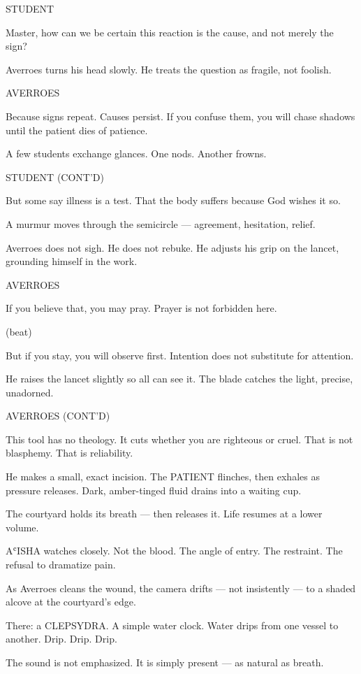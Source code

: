 \documentclass[12pt]{article}
\newlength{\charindent}
\newlength{\dialogueindent}
\newlength{\dialoguewidth}
\newlength{\parentheticalindent}
\newcommand{\action}[1]{%
  \noindent#1\par\vspace{0.75em}%
}
\newcommand{\character}[1]{%
  \needspace{3\baselineskip}%
  \par\vspace{0.5em}%
  \noindent\hspace*{\charindent}\MakeUppercase{#1}\nopagebreak[4]%
}
\newcommand{\parenthetical}[1]{%
  \par\nobreak\nopagebreak[4]%
  \noindent\hspace*{\parentheticalindent}(#1)%
}
\newcommand{\dialogue}[1]{%
  \par\nobreak\nopagebreak[4]%
  \noindent\hspace*{\dialogueindent}%
  \begin{minipage}[t]{\dialoguewidth}
  #1
  \end{minipage}%
  \par\vspace{0.5em}%
}
\newcommand{\contd}{\textsc{(cont'd)}}
\newcommand{\beat}{\parenthetical{beat}}
\begin{document}
\character{STUDENT}
\dialogue{Master, how can we be certain this reaction is the cause, and not merely the sign?}

\action{Averroes turns his head slowly. He treats the question as fragile, not foolish.}

\character{AVERROES}
\dialogue{Because signs repeat. Causes persist. If you confuse them, you will chase shadows until the patient dies of patience.}

\action{A few students exchange glances. One nods. Another frowns.}

\character{STUDENT \contd}
\dialogue{But some say illness is a test. That the body suffers because God wishes it so.}

\action{A murmur moves through the semicircle — agreement, hesitation, relief.}

\action{Averroes does not sigh. He does not rebuke. He adjusts his grip on the lancet, grounding himself in the work.}

\character{AVERROES}
\dialogue{If you believe that, you may pray. Prayer is not forbidden here.}

\beat

\dialogue{But if you stay, you will observe first. Intention does not substitute for attention.}

\action{He raises the lancet slightly so all can see it. The blade catches the light, precise, unadorned.}

\character{AVERROES \contd}
\dialogue{This tool has no theology. It cuts whether you are righteous or cruel. That is not blasphemy. That is reliability.}

\action{He makes a small, exact incision. The PATIENT flinches, then exhales as pressure releases. Dark, amber-tinged fluid drains into a waiting cup.}

\action{The courtyard holds its breath — then releases it. Life resumes at a lower volume.}

\action{AʿISHA watches closely. Not the blood. The angle of entry. The restraint. The refusal to dramatize pain.}

\action{As Averroes cleans the wound, the camera drifts — not insistently — to a shaded alcove at the courtyard’s edge.}

\action{There: a CLEPSYDRA. A simple water clock. Water drips from one vessel to another. Drip. Drip. Drip.}

\action{The sound is not emphasized. It is simply present — as natural as breath.}
\end{document}
